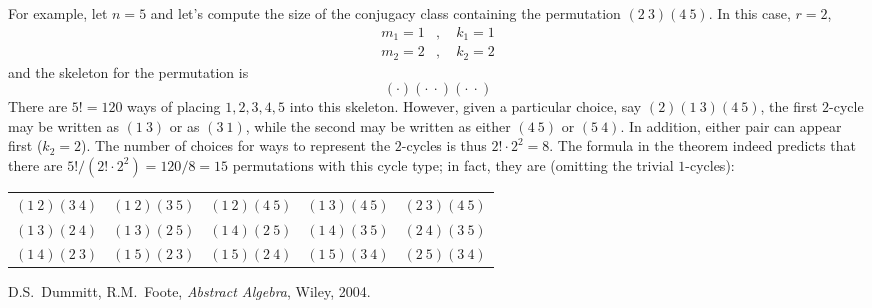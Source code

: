 \documentclass[12pt]{article}
\theoremstyle{definition}
\begin{document}
For example, let $n=5$ and let's compute the size of the conjugacy class containing the permutation $(2~3)(4~5)$. In this case, $r=2$,
\begin{align*}
m_1=1 & ,\quad k_1=1\\
m_2=2 & ,\quad k_2=2
\end{align*}
and the skeleton for the permutation is
\[(\cdot)(\cdot~\cdot)(\cdot~\cdot)\]
There are $5!=120$ ways of placing $1,2,3,4,5$ into this skeleton. However, given a particular choice, say $(2)(1~3)(4~5)$, the first $2$-cycle may be written as $(1~3)$ or as $(3~1)$, while the second may be written as either $(4~5)$ or $(5~4)$. In addition, either pair can appear first ($k_2=2$). The number of choices for ways to represent the $2$-cycles is thus $2! \cdot 2^2=8$. The formula in the theorem indeed predicts that there are $5!/(2!\cdot 2^2)=120/8=15$ permutations with this cycle type; in fact, they are (omitting the trivial $1$-cycles):
\begin{center}
\begin{tabular}{ccccc}
$(1~2)(3~4)$ & $(1~2)(3~5)$ & $(1~2)(4~5)$ & $(1~3)(4~5)$ & $(2~3)(4~5)$\\
$(1~3)(2~4)$ & $(1~3)(2~5)$ & $(1~4)(2~5)$ & $(1~4)(3~5)$ & $(2~4)(3~5)$\\
$(1~4)(2~3)$ & $(1~5)(2~3)$ & $(1~5)(2~4)$ & $(1~5)(3~4)$ & $(2~5)(3~4)$
\end{tabular}
\end{center}

\begin{thebibliography}{10}
D.S.~Dummitt, R.M.~Foote, \emph{Abstract Algebra}, Wiley, 2004.
\end{thebibliography}
\end{document}
